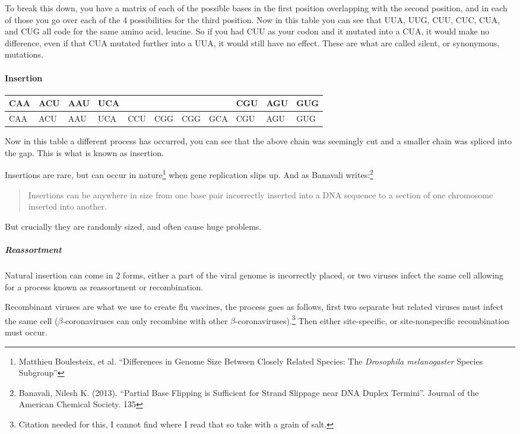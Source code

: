 \documentclass[11pt]{article}
\begin{document}
To break this down, you have a matrix of each of the possible bases in the first position overlapping with the second position, and in each of those you go over each of the 4 possibilities for the third position. Now in this table you can see that UUA, UUG, CUU, CUC, CUA, and CUG all code for the same amino acid, leucine. So if you had CUU as your codon and it mutated into a CUA, it would make no difference, even if that CUA mutated further into a UUA, it would still have no effect. These are what are called silent, or synonymous, mutations.
\paragraph{Insertion}
\label{sec:org9e3858c}
\begin{center}
\begin{tabular}{lllllllllll}
CAA & ACU & AAU & UCA &  &  &  &  & CGU & AGU & GUG\\
\hline
CAA & ACU & AAU & UCA & CCU & CGG & CGG & GCA & CGU & AGU & GUG\\
\end{tabular}
\end{center}
Now in this table a different process has occurred, you can see that the above chain was seemingly cut and a smaller chain was spliced into the gap. This is what is known as insertion.

Insertions are rare, but can occur in nature\footnote{Matthieu Boulesteix, et al. ``Differences in Genome Size Between Closely Related Species: The \emph{Drosophila melanogaster} Species Subgroup''} when gene replication slips up. And as Banavali writes:\footnote{Banavali, Nilesh K. (2013). ``Partial Base Flipping is Sufficient for Strand Slippage near DNA Duplex Termini''. Journal of the American Chemical Society. 135}
\begin{quote}
Insertions can be anywhere in size from one base pair incorrectly inserted into a DNA sequence to a section of one chromosome inserted into another.
\end{quote}
But crucially they are randomly sized, and often cause huge problems.

\subparagraph{Reassortment}
\label{sec:org2fa76fa}
Natural insertion can come in 2 forms, either a part of the viral genome is incorrectly placed, or two viruses infect the same cell allowing for a process known as reassortment or recombination.

Recombinant viruses are what we use to create flu vaccines, the process goes as follows, first two separate but related viruses must infect the same cell (\(\beta\)-coronaviruses can only recombine with other \(\beta\)-coronaviruses).\footnote{Citation needed for this, I cannot find where I read that so take with a grain of salt.} Then either site-specific, or site-nonspecific recombination must occur.
\end{document}
